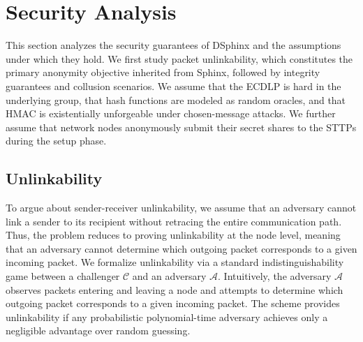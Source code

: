 \section{Security Analysis}\label{sec:security}

This section analyzes the security guarantees of DSphinx and the assumptions under which they hold. 
We first study packet unlinkability, which constitutes the primary anonymity objective inherited from Sphinx, followed by integrity guarantees and collusion scenarios.
We assume that the ECDLP is hard in the underlying group, that hash functions are modeled as random oracles, and that HMAC is existentially unforgeable under chosen-message attacks. 
We further assume that network nodes anonymously submit their secret shares to the STTPs during the setup phase.

\subsection{Unlinkability}\label{sec:unlinkability}

To argue about sender-receiver unlinkability, we assume that an adversary cannot link a sender to its recipient without retracing the entire communication path.  
Thus, the problem reduces to proving unlinkability at the node level, meaning that an adversary cannot determine which outgoing packet corresponds to a given incoming packet.
We formalize unlinkability via a standard indistinguishability game between a challenger $\mathcal{C}$ and an adversary $\mathcal{A}$.
Intuitively, the adversary $\mathcal{A}$ observes packets entering and leaving a node and attempts to determine which outgoing packet corresponds to a given incoming packet.
The scheme provides unlinkability if any probabilistic polynomial-time adversary achieves only a negligible advantage over random guessing.


